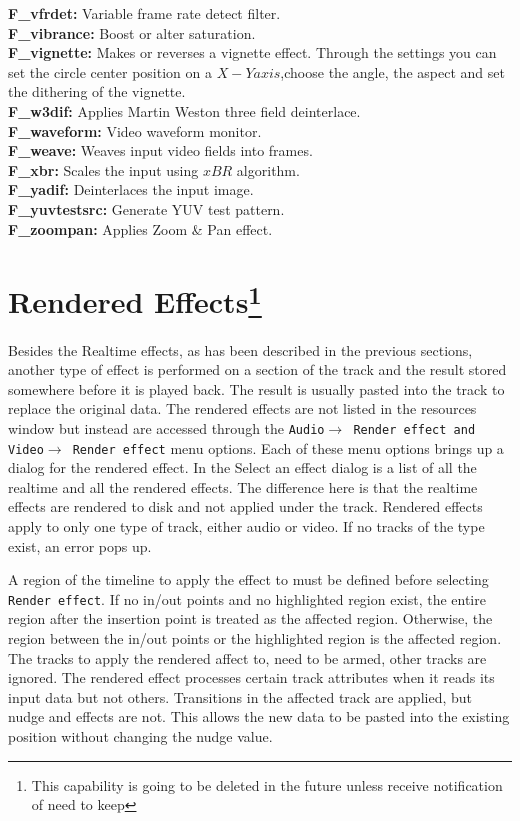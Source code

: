 \textbf{F\_vfrdet:} Variable frame rate detect filter.\\
\textbf{F\_vibrance:} Boost or alter saturation.\\
\textbf{F\_vignette:} Makes or reverses a vignette effect. Through the settings you can set the circle center position on a $X-Y axis$,choose the angle, the aspect and set the dithering of the vignette.\\
\textbf{F\_w3dif:} Applies Martin Weston three field deinterlace.\\
\textbf{F\_waveform:} Video waveform monitor.\\
\textbf{F\_weave:} Weaves input video fields into frames.\\
\textbf{F\_xbr:} Scales the input using $xBR$ algorithm.\\
\textbf{F\_yadif:} Deinterlaces the input image.\\
\textbf{F\_yuvtestsrc:} Generate YUV test pattern.\\
\textbf{F\_zoompan:} Applies Zoom \& Pan effect.

\section{Rendered Effects\protect\footnote{This capability is going to be deleted in the future unless receive notification of need to keep}}%
\label{sec:rendered_effects}

Besides the Realtime effects, as has been described in the previous sections, another type of effect is performed on a section of the track and the result stored somewhere before it is played back. The result is usually pasted into the track to replace the original data. The rendered effects are not listed in the resources window but instead are accessed through the \texttt{Audio$\rightarrow$ Render effect and Video$\rightarrow$ Render effect} menu options. Each of these menu options brings up a dialog for the rendered effect. In the Select an effect dialog is a list of all the realtime and all the rendered effects. The difference here is that the realtime effects are rendered to disk and not applied under the track. Rendered effects apply to only one type of track, either audio or video. If no tracks of the type exist, an error pops up.

A region of the timeline to apply the effect to must be defined before selecting \texttt{Render effect}. If no in/out points and no highlighted region exist, the entire region after the insertion point is treated as the affected region. Otherwise, the region between the in/out points or the highlighted region is the affected region. The tracks to apply the rendered affect to, need to be armed, other tracks are ignored. The rendered effect processes certain track attributes when it reads its input data but not others. Transitions in the affected track are applied, but nudge and effects are not. This allows the new data to be pasted into the existing position without changing the nudge value.

